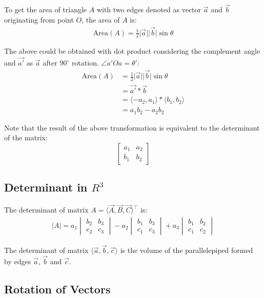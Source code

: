 \documentclass[12pt]{article}
\newcommand{\mo}[1]{\lvert #1 \rvert}
\newcommand{\mov}[1]{\lvert \vec{#1} \rvert}
\newcommand{\iv}[1]{\langle #1 \rangle}
\theoremstyle{definition}
\begin{document}
	To get the area of triangle $A$ with two edges denoted as vector $\vec{a}$ and $\vec{b}$ originating from point $O$, the area of $A$ is:
	\begin{gather*}
		\text{Area}(A) = \frac{1}{2} \mov{a}\mov{b} \sin \theta
	\end{gather*}
	
	The above could be obtained with dot product considering the complement angle and $\vec{a'}$ as $\vec{a}$ after $90^\circ$ rotation. $\angle a'Oa = \theta'$:
	\begin{align*}
		\text{Area}(A) &= \frac{1}{2} \mov{a}\mov{b} \sin \theta \\
		&= \vec{a'} * \vec{b} \\
		&= \iv{-a_2, a_1} * \iv{b_1, b_2} \\
		&= a_1 b_2 - a_2 b_2
	\end{align*}
	
	Note that the result of the above transformation is equivalent to the determinant of the matrix:
	\begin{equation*}
	\begin{bmatrix}
		a_1 & a_2 \\ b_1 & b_2
	\end{bmatrix}
	\end{equation*}
	
	\subsection{Determinant in $R^3$}
	
	The determinant of matrix $A = \iv{\vec{A}, \vec{B}, \vec{C}}^\top$ is:
	\begin{align*}
		\mo{A} = a_1
		\begin{vmatrix}
			b_2 & b_3 \\ c_2 & c_3
		\end{vmatrix} - a_2
		\begin{vmatrix}
			b_1 & b_3 \\ c_1 & c_3
		\end{vmatrix} + a_3
		\begin{vmatrix} 
			b_1 & b_2 \\ c_1 & c_2
		\end{vmatrix} 
	\end{align*}
	
	The determinant of matrix $\iv{\vec{a}, \vec{b}, \vec{c}}$ is the volume of the parallelepiped formed by edges $\vec{a}$, $\vec{b}$ and $\vec{c}$.
	
	\subsection{Rotation of Vectors}
	
\end{document}
